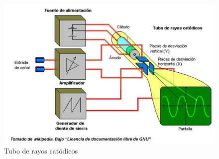 \documentclass{report}
\begin{document}
\begin{figure}[H]
\begin{center}
\includegraphics[width=\linewidth]{F1}
\end{center}
\caption{Tubo de rayos catódicos}
\label{F1}
\end{figure}
\end{document}
